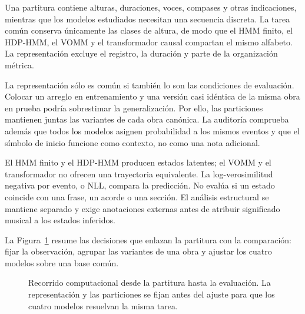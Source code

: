 Una partitura contiene alturas, duraciones, voces, compases y otras indicaciones, mientras que los modelos estudiados necesitan una secuencia discreta. La tarea común conserva únicamente las clases de altura, de modo que el HMM finito, el HDP-HMM, el VOMM y el transformador causal compartan el mismo alfabeto. La representación excluye el registro, la duración y parte de la organización métrica.

La representación sólo es común si también lo son las condiciones de evaluación. Colocar un arreglo en entrenamiento y una versión casi idéntica de la misma obra en prueba podría sobrestimar la generalización. Por ello, las particiones mantienen juntas las variantes de cada obra canónica. La auditoría comprueba además que todos los modelos asignen probabilidad a los mismos eventos y que el símbolo de inicio funcione como contexto, no como una nota adicional.

El HMM finito y el HDP-HMM producen estados latentes; el VOMM y el transformador no ofrecen una trayectoria equivalente. La log-verosimilitud negativa por evento, o NLL, compara la predicción. No evalúa si un estado coincide con una frase, un acorde o una sección. El análisis estructural se mantiene separado y exige anotaciones externas antes de atribuir significado musical a los estados inferidos.

La Figura~\ref{fig:chapter0-pipeline} resume las decisiones que enlazan la partitura con la comparación: fijar la observación, agrupar las variantes de una obra y ajustar los cuatro modelos sobre una base común.

\begin{figure}[H]
\centering
{}
\caption{Recorrido computacional desde la partitura hasta la evaluación. La representación y las particiones se fijan antes del ajuste para que los cuatro modelos resuelvan la misma tarea.}
\label{fig:chapter0-pipeline}
\end{figure}

